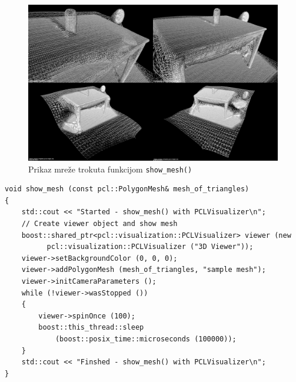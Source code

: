 \begin{figure}[h]
\centering
\includegraphics[scale=0.25]{figures/tablescene-mesh-perspectives.png}
\caption{Prikaz mreže trokuta funkcijom \texttt{show\_mesh()} }
\label{fig:tablesecne-mesh-perspectives}
\end{figure}

\begin{lstlisting}[label=lstPrikaz,caption={Izvorni kod funkcije
\texttt{show\_mesh()} }]
void show_mesh (const pcl::PolygonMesh& mesh_of_triangles)
{
    std::cout << "Started - show_mesh() with PCLVisualizer\n";
    // Create viewer object and show mesh
    boost::shared_ptr<pcl::visualization::PCLVisualizer> viewer (new
          pcl::visualization::PCLVisualizer ("3D Viewer"));
    viewer->setBackgroundColor (0, 0, 0);
    viewer->addPolygonMesh (mesh_of_triangles, "sample mesh");
    viewer->initCameraParameters (); 
    while (!viewer->wasStopped ())
    {
        viewer->spinOnce (100); 
        boost::this_thread::sleep 
            (boost::posix_time::microseconds (100000));
    }
    std::cout << "Finshed - show_mesh() with PCLVisualizer\n";
}
\end{lstlisting}




